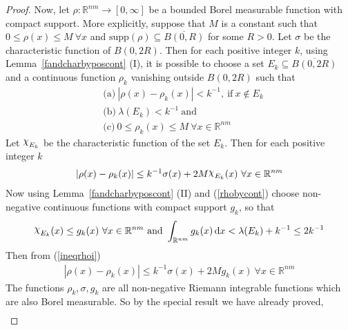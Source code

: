 \documentclass[11pt]{article}
\theoremstyle{definition}
\theoremstyle{proof}
\newcommand{\mychi}{\raisebox{2pt}{$\chi$}}
\begin{document}
\begin{proof}
    Now, let $\rho : \mathbb{R}^{nm} \to [0, \infty]$ be a bounded Borel measurable function with compact support.
    More explicitly, suppose that $M$ is a constant such that $0 \leq \rho (x) \leq M \ \forall x$ and $\text{supp} (\rho ) \subseteq \overline{B(0, R)}$ for some $R > 0$.
    Let $\sigma$ be the characteristic function of ${B(0, 2R)}$.
    Then for each positive integer $k$, using Lemma~\ref{fandcharbyposcont} (I), it is possible to choose a set $E_k \subseteq \overline{B(0, 2R)}$ and a continuous function $\rho _k$ vanishing outside $B(0, 2R)$ such that
    \begin{equation}\label{rhobycont}
        \begin{split}
            &\text{(a)} \ |\rho (x) - \rho _k (x)| < k^{-1}, \ \text{if} \ x \notin E_k \\
            &\text{(b)} \ \lambda (E_k) < k^{-1} \ \text{and} \\
            &\text{(c)} \ 0 \leq \rho _k (x) \leq M \ \forall x \in \mathbb{R}^{nm}
        \end{split}
    \end{equation}
    Let $\mychi _{E_k}$ be the characteristic function of the set $E_k$.
    Then for each positive integer $k$
    \begin{align}\label{ineqrhoi}
        |\rho (x) - \rho _k (x)| \leq k^{-1} \sigma (x) + 2 M \mychi _{E_k} (x) \ \forall x \in \mathbb{R}^{nm}
    \end{align}
    Now using Lemma~\ref{fandcharbyposcont} (II) and (\ref{rhobycont}) choose non-negative continuous functions with compact support $g_k$, so that
    \begin{align}\label{g_k}
        \mychi _{E_k}(x) \leq g_k(x) \ \forall x \in \mathbb{R}^{nm} \ \text{and} \ \int_{\mathbb{R}^{nm}} g_k(x) \, \mathrm{d} x < \lambda (E_k) + k^{-1} \leq 2 k^{-1}
    \end{align}
    Then from (\ref{ineqrhoi})
    \begin{align}\label{ineqrhoii}
        |\rho (x) - \rho _k (x)| \leq k^{-1} \sigma (x) + 2M g_k(x) \ \forall x \in \mathbb{R}^{nm}
    \end{align}
    The functions $\rho _k, \sigma, g_k$ are all non-negative Riemann integrable functions which are also Borel measurable.
    So by the special result we have already proved,
    \begin{equation}\label{integrations}
        \begin{split}

\end{split}
\end{equation}
\end{proof}
\end{document}
